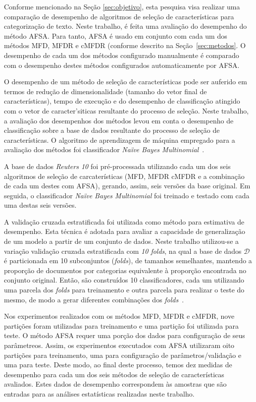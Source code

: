 \documentclass[conference]{IEEEtran}
\begin{document}
Conforme mencionado na Seção \ref{sec:objetivo}, esta pesquisa visa realizar uma comparação de desempenho de algoritmos de seleção de características para categorização de texto.
Neste trabalho, é feita uma avaliação do desempenho do método AFSA. Para tanto, AFSA é usado em conjunto com cada um dos métodos MFD, MFDR e cMFDR (conforme descrito na Seção~\ref{sec:metodos}. O desempenho de cada um dos métodos configurado manualmente é comparado com o desempenho destes métodos configurados automaticamente por AFSA.

O desempenho de um método de seleção de características pode ser auferido em termos de redução de dimensionalidade (tamanho do vetor final de características), tempo de execução e do desempenho de classificação atingido com o vetor de caracter'siticas resultante do processo de seleção. Neste trabalho, a avaliação dos desempenhos dos métodos levou em conta o desempenho de classificação sobre a base de dados resultante do processo de seleção de características. O algoritmo de aprendizagem de máquina empregado para a avaliação dos métodos foi classificador \textit{Na\"ive Bayes Multinomial}~\cite{mccallum1998comparison}. 

A base de dados \textit{Reuters 10} foi pré-processada utilizando cada um dos seis algoritmos de seleção de carcaterísticas (MFD, MFDR cMFDR e a combinação de cada um destes com AFSA), gerando, assim, seis versões da base original. Em seguida, o classificador \textit{Na\"ive Bayes Multinomial} foi treinado e testado com cada uma destas seis versões.

A validação cruzada estratificada foi utilizada como método para estimativa de desempenho.
Esta técnica é adotada para avaliar a capacidade de generalização de um modelo a partir de um conjunto de dados.
Neste trabalho utilizou-se a variação validação cruzada estratificada com \emph{10 folds}, na qual a base de dados $\mathcal{D}$ é particionada em 10 subconjuntos (\emph{folds}), de tamanhos semelhantes, mantendo a proporção de documentos por categorias equivalente à proporção encontrada no conjunto original. Então, são construídos 10 classificadores, cada um utilizando uma parcela dos \emph{folds} para treinamento e outra parcela para realizar o teste do mesmo, de modo a gerar diferentes combinações dos \emph{folds}~\cite{kohavi1995study}.

Nos experimentos realizados com os métodos MFD, MFDR e cMFDR, nove partições foram utilizadas para treinamento e uma partição foi utilizada para teste.
O método AFSA requer uma porção dos dados para configuração de seus parâmetreos. Assim, os experimentos executados com AFSA utilizaram oito partições para treinamento, uma para configuração de parâmetros/validação e uma para teste.
Deste modo, ao final deste processo, temos dez medidas de desempenho para cada um dos seis métodos de seleção de características avaliados.
Estes dados de desempenho correspondem às amostras que são entradas para as análises estatísticas realizadas neste trabalho.
\end{document}

